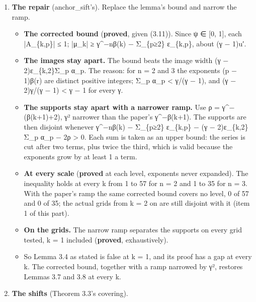 \begin{enumerate}
\begin{itemize}
\item The proof first bounds (3.11), μ with each α\_\allowbreak{}p cut to its first k terms, α\_\allowbreak{}p − ε\_\allowbreak{}\{k,p\}. That bound holds: its least gap on every grid tested is the last column, at least the margin, and exactly on it at k = 1.
\item It then says the tails Σ\_\allowbreak{}p ε\_\allowbreak{}\{k,p\}A\_\allowbreak{}\{k,p\}, with A\_\allowbreak{}\{k,p\} = ψ(d\_\allowbreak{}p) − ψ(d′\_\allowbreak{}p), are “too small to annihilate” γ\textasciicircum{}−nβ(k). That is true, and it does not keep |μ\_\allowbreak{}k| at or above γ\textasciicircum{}−nβ(k): at k = 1 the tails pull it from 10 units to 9.0999099….
\item So the lemma's bound fails at k = 1. At every k the proof's last step does not prove it.
\end{itemize}
\item \textbf{The repair} (anchor\_\allowbreak{}sift's). Replace the lemma's bound and narrow the ramp.

\begin{itemize}
\item \textbf{The corrected bound} (\textbf{proved}, given (3.11)). Since ψ ∈ [0, 1], each |A\_\allowbreak{}\{k,p\}| ≤ 1; |μ\_\allowbreak{}k| ≥ γ\textasciicircum{}−nβ(k) − Σ\_\allowbreak{}\{p≥2\} ε\_\allowbreak{}\{k,p\}, about (γ − 1)u′.
\item \textbf{The images stay apart.} The bound beats the image width (γ − 2)ε\_\allowbreak{}\{k,2\}Σ\_\allowbreak{}p α\_\allowbreak{}p. The reason: for n = 2 and 3 the exponents (p − 1)β(r) are distinct positive integers; Σ\_\allowbreak{}p α\_\allowbreak{}p < γ/(γ − 1), and (γ − 2)γ/(γ − 1) < γ − 1 for every γ.
\item \textbf{The supports stay apart with a narrower ramp.} Use ρ = γ\textasciicircum{}−(β(k+1)+2), γ² narrower than the paper's γ\textasciicircum{}−β(k+1). The supports are then disjoint whenever γ\textasciicircum{}−nβ(k) − Σ\_\allowbreak{}\{p≥2\} ε\_\allowbreak{}\{k,p\} − (γ − 2)ε\_\allowbreak{}\{k,2\}Σ\_\allowbreak{}p α\_\allowbreak{}p − 2ρ > 0. Each sum is taken as an upper bound: the series is cut after two terms, plus twice the third, which is valid because the exponents grow by at least 1 a term.
\item \textbf{At every scale} (\textbf{proved} at each level, exponents never expanded). The inequality holds at every k from 1 to 57 for n = 2 and 1 to 35 for n = 3. With the paper's ramp the same corrected bound covers no level, 0 of 57 and 0 of 35; the actual grids from k = 2 on are still disjoint with it (item 1 of this part).
\item \textbf{On the grids.} The narrow ramp separates the supports on every grid tested, k = 1 included (\textbf{proved}, exhaustively).
\item So Lemma 3.4 as stated is false at k = 1, and its proof has a gap at every k. The corrected bound, together with a ramp narrowed by γ², restores Lemmas 3.7 and 3.8 at every k.
\end{itemize}
\item \textbf{The shifts} (Theorem 3.3's covering).


\end{enumerate}
